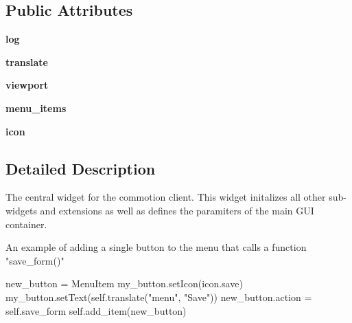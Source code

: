 \subsection*{Public Attributes}
\begin{DoxyCompactItemize}
\item 
\hypertarget{classcommotion__client_1_1GUI_1_1extension__toolbar_1_1ExtensionToolBar_a6319ad6aa6c0480e17413b5c8a018d5f}{{\bfseries log}}\label{classcommotion__client_1_1GUI_1_1extension__toolbar_1_1ExtensionToolBar_a6319ad6aa6c0480e17413b5c8a018d5f}

\item 
\hypertarget{classcommotion__client_1_1GUI_1_1extension__toolbar_1_1ExtensionToolBar_ad52b111af7587b8ed8fb2e1703f8251b}{{\bfseries translate}}\label{classcommotion__client_1_1GUI_1_1extension__toolbar_1_1ExtensionToolBar_ad52b111af7587b8ed8fb2e1703f8251b}

\item 
\hypertarget{classcommotion__client_1_1GUI_1_1extension__toolbar_1_1ExtensionToolBar_ae4fb6875e8968fb1b48a516117ee010f}{{\bfseries viewport}}\label{classcommotion__client_1_1GUI_1_1extension__toolbar_1_1ExtensionToolBar_ae4fb6875e8968fb1b48a516117ee010f}

\item 
\hypertarget{classcommotion__client_1_1GUI_1_1extension__toolbar_1_1ExtensionToolBar_a4c951281d81006ea5a1603030f4fa799}{{\bfseries menu\-\_\-items}}\label{classcommotion__client_1_1GUI_1_1extension__toolbar_1_1ExtensionToolBar_a4c951281d81006ea5a1603030f4fa799}

\item 
\hypertarget{classcommotion__client_1_1GUI_1_1extension__toolbar_1_1ExtensionToolBar_afa628724b1895e1fe4f5bd5605ead016}{{\bfseries icon}}\label{classcommotion__client_1_1GUI_1_1extension__toolbar_1_1ExtensionToolBar_afa628724b1895e1fe4f5bd5605ead016}

\end{DoxyCompactItemize}


\subsection{Detailed Description}
\begin{DoxyVerb}The central widget for the commotion client. This widget initalizes all other sub-widgets and extensions as well as defines the paramiters of the main GUI container.


An example of adding a single button to the menu that calls a function "save_form()"

new_button = MenuItem
my_button.setIcon(icon.save)
my_button.setText(self.translate("menu", "Save"))
new_button.action = self.save_form
self.add_item(new_button)\end{DoxyVerb}
 

